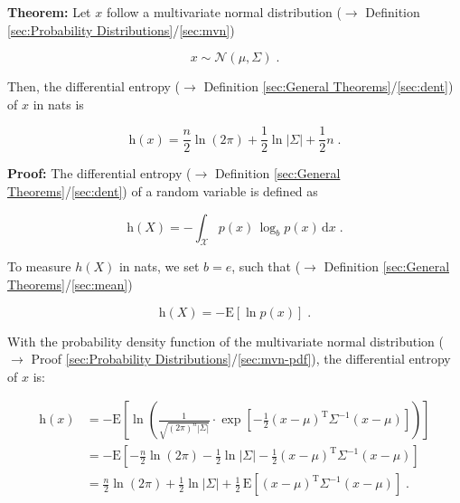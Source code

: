 \documentclass[a4paper,12pt,twoside]{book}
\begin{document}
\textbf{Theorem:} Let $x$ follow a multivariate normal distribution ($\rightarrow$ Definition \ref{sec:Probability Distributions}/\ref{sec:mvn})

\begin{equation} \label{eq:mvn-dent-mvn}
x \sim \mathcal{N}(\mu, \Sigma) \; .
\end{equation}

Then, the differential entropy ($\rightarrow$ Definition \ref{sec:General Theorems}/\ref{sec:dent}) of $x$ in nats is

\begin{equation} \label{eq:mvn-dent-mvn-dent}
\mathrm{h}(x) = \frac{n}{2} \ln(2\pi) + \frac{1}{2} \ln|\Sigma| + \frac{1}{2} n \; .
\end{equation}


\vspace{1em}
\textbf{Proof:} The differential entropy ($\rightarrow$ Definition \ref{sec:General Theorems}/\ref{sec:dent}) of a random variable is defined as

\begin{equation} \label{eq:mvn-dent-dent}
\mathrm{h}(X) = - \int_{\mathcal{X}} p(x) \, \log_b p(x) \, \mathrm{d}x \; .
\end{equation}

To measure $h(X)$ in nats, we set $b = e$, such that ($\rightarrow$ Definition \ref{sec:General Theorems}/\ref{sec:mean})

\begin{equation} \label{eq:mvn-dent-dent-nats}
\mathrm{h}(X) = - \mathrm{E}\left[ \ln p(x) \right] \; .
\end{equation}

With the probability density function of the multivariate normal distribution ($\rightarrow$ Proof \ref{sec:Probability Distributions}/\ref{sec:mvn-pdf}), the differential entropy of $x$ is:

\begin{equation} \label{eq:mvn-dent-mvn-dent-s1}
\begin{split}
\mathrm{h}(x) &= - \mathrm{E}\left[ \ln \left( \frac{1}{\sqrt{(2 \pi)^n |\Sigma|}} \cdot \exp \left[ -\frac{1}{2} (x-\mu)^\mathrm{T} \Sigma^{-1} (x-\mu) \right] \right) \right] \\
&= - \mathrm{E}\left[ - \frac{n}{2} \ln(2\pi) - \frac{1}{2} \ln|\Sigma| - \frac{1}{2} (x-\mu)^\mathrm{T} \Sigma^{-1} (x-\mu) \right] \\
&= \frac{n}{2} \ln(2\pi) + \frac{1}{2} \ln|\Sigma| + \frac{1}{2} \, \mathrm{E}\left[ (x-\mu)^\mathrm{T} \Sigma^{-1} (x-\mu) \right] \; .
\end{split}
\end{equation}
\end{document}
